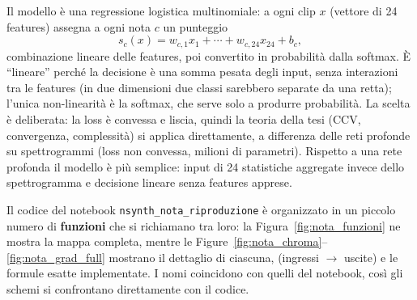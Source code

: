 \documentclass[a4paper,12pt]{article}
\numberwithin{equation}{section}
\numberwithin{figure}{section}
\numberwithin{table}{section}
\begin{document}
Il modello è una regressione logistica multinomiale: a ogni clip $x$
(vettore di 24 features) assegna a ogni nota $c$ un punteggio
\[
  s_c(x) = w_{c,1}x_1 + \cdots + w_{c,24}x_{24} + b_c,
\]
combinazione lineare delle features, poi convertito in probabilità dalla
softmax. È ``lineare'' perché la decisione è una somma pesata degli input,
senza interazioni tra le features (in due dimensioni due classi sarebbero
separate da una retta); l'unica non-linearità è la softmax, che serve solo a
produrre probabilità. La scelta è deliberata: la loss è convessa e liscia,
quindi la teoria della tesi (CCV, convergenza, complessità) si applica
direttamente, a differenza delle reti profonde su spettrogrammi (loss non
convessa, milioni di parametri). Rispetto a una rete profonda il modello è più
semplice: input di 24 statistiche aggregate invece dello spettrogramma e
decisione lineare senza features apprese.

Il codice del notebook \texttt{nsynth\_nota\_riproduzione} è organizzato in
un piccolo numero di \textbf{funzioni} che si richiamano tra loro: la
Figura~\ref{fig:nota_funzioni} ne mostra la mappa completa, mentre le
Figure~\ref{fig:nota_chroma}--\ref{fig:nota_grad_full} mostrano il dettaglio
di ciascuna, (ingressi $\to$ uscite) e le formule esatte
implementate. I nomi coincidono con quelli del notebook, così gli schemi si
confrontano direttamente con il codice.
\end{document}
